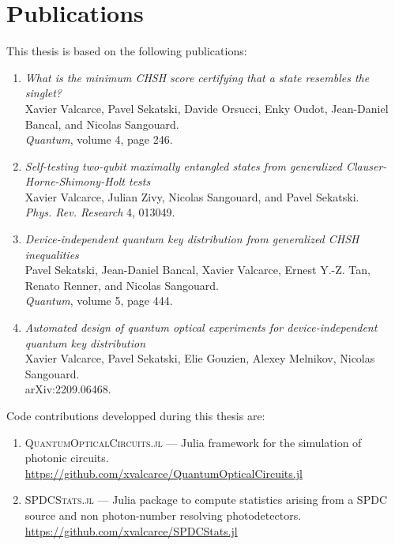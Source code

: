 \chapter{Publications}

This thesis is based on the following publications:

\begin{enumerate}
	\item 
		\textit{What is the minimum CHSH score certifying that a state resembles the singlet?} \\
		Xavier Valcarce, Pavel Sekatski, Davide Orsucci, Enky Oudot, Jean-Daniel Bancal, and Nicolas Sangouard. \\
		\textit{Quantum}, volume 4, page 246.
	\item 
		\textit{Self-testing two-qubit maximally entangled states from generalized Clauser-Horne-Shimony-Holt tests} \\
		Xavier Valcarce, Julian Zivy, Nicolas Sangouard, and Pavel Sekatski. \\
		\textit{Phys. Rev. Research} 4, 013049.
	\item
		\textit{Device-independent quantum key distribution from generalized CHSH inequalities} \\
		Pavel Sekatski, Jean-Daniel Bancal, Xavier Valcarce, Ernest Y.-Z. Tan, Renato Renner, and Nicolas Sangouard. \\
		\textit{Quantum}, volume 5, page 444.
	\item
		\textit{Automated design of quantum optical experiments for device-independent quantum key distribution}  \\
		Xavier Valcarce, Pavel Sekatski, Elie Gouzien, Alexey Melnikov, Nicolas Sangouard. \\
		arXiv:2209.06468.
\end{enumerate}

Code contributions developped during this thesis are:

\begin{enumerate}
	\item \textsc{QuantumOpticalCircuits.jl} --- Julia framework for the simulation of photonic circuits. \\
		\url{https://github.com/xvalcarce/QuantumOpticalCircuits.jl}
	\item \textsc{SPDCStats.jl} --- Julia package to compute statistics arising from a SPDC source and non photon-number resolving photodetectors. \\
		\url{https://github.com/xvalcarce/SPDCStats.jl}
\end{enumerate}
